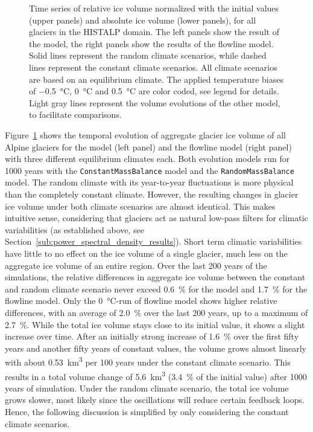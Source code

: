 \begin{figure}[t!]
          \caption{Time series of relative ice volume normalized with the initial values (upper panels) and absolute ice volume (lower panels), for all glaciers in the HISTALP domain. The left panels show the result of the \vas{} model, the right panels show the results of the flowline model. Solid lines represent the random climate scenarios, while dashed lines represent the constant climate scenarios. All climate scenarios are based on an equilibrium climate. The applied temperature biases of \SI{-.5}{\celsius}, \SI{0}{\celsius} and \SI{+.5}{\celsius} are color coded, see legend for details. Light gray lines represent the volume evolutions of the other model, to facilitate comparisons.}
          \label{fig:histalp_commitment}
        \end{figure}

        Figure~\ref{fig:histalp_commitment} shows the temporal evolution of aggregate glacier ice volume of all Alpine glaciers for the \vas{} model (left panel) and the flowline model (right panel) with three different equilibrium climates each. Both evolution models run for 1000 years with the \lstinline`ConstantMassBalance` model and the \lstinline`RandomMassBalance` model. The random climate with its year-to-year fluctuations is more physical than the completely constant climate. However, the resulting changes in glacier ice volume under both climate scenarios are almost identical. This makes intuitive sense, considering that glaciers act as natural low-pass filters for climatic variabilities (as established above, see Section~\ref{sub:power_spectral_density_results}). Short term climatic variabilities have little to no effect on the ice volume of a single glacier, much less on the aggregate ice volume of an entire region. Over the last 200 years of the simulations, the relative differences in aggregate ice volume between the constant and random climate scenario never exceed \SI{0.6}{\percent} for the \vas{} model and \SI{1.7}{\percent} for the flowline model. Only the \SI{0}{\celsius}-run of flowline model shows higher relative differences, with an average of \SI{2.0}{\percent} over the last 200 years, up to a maximum of \SI{2.7}{\percent}. While the total ice volume stays close to its initial value, it shows a slight increase over time. After an initially strong increase of \SI{1.6}{\percent} over the first fifty years and another fifty years of constant values, the volume grows almost linearly with about \SI{0.53}{\cubic\kilo\meter} per 100 years under the constant climate scenario. This results in a total volume change of \SI{5.6}{\cubic\kilo\meter} (\SI{+3.4}{\percent} of the initial value) after 1000 years of simulation. Under the random climate scenario, the total ice volume grows slower, most likely since the oscillations will reduce certain feedback loops. Hence, the following discussion is simplified by only considering the constant climate scenarios. 

